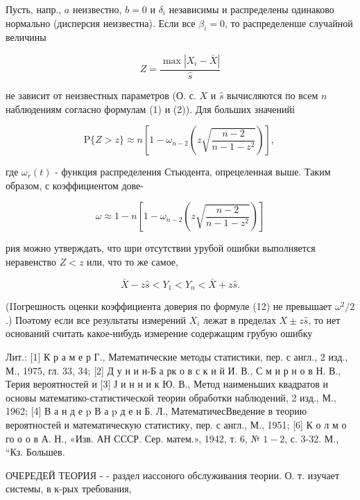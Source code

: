\documentclass[10pt]{article}
\begin{document}
Пусть, напр., $a$ неизвестно, $b=0$ и $\delta_{i}$ независимы и распределены одинаково нормально (дисперсия неизвестна). Если все $\beta_{i}=0$, то распределенше случайной величины



\[

Z=\frac{\max \left|X_{i}-\bar{X}\right|}{\hat{s}}

\]



не зависит от неизвестных параметров (О. с. $X$ и $\hat{s}$ вычисляются по всем $n$ наблюдениям согласно формулам (1) и (2)). Для больших значенийі



\[

\mathrm{P}\{Z>z\} \approx n\left[1-\omega_{n-2}\left(z \sqrt{\frac{n-2}{n-1-z^{2}}}\right)\right] \text {, }

\]



где $\omega_{r}(t)$ - функция распределения Стьюдента, опрецеленная выше. Таким образом, с коэффициентом дове-



\[

\omega \approx 1-n\left[1-\omega_{n-2}\left(z \sqrt{\frac{n-2}{n-1-z^{2}}}\right)\right]

\]



рия можно утверждать, что шри отсутствии урубой ошибки выполняется неравенство $Z<z$ или, что то же самое,



\[

\bar{X}-z \hat{s}<Y_{1}<Y_{n}<\bar{X}+z \hat{s} .

\]



(IIогрешность оценки коэффициента доверия по формуле (12) не превышает $\omega^{2} / 2$.) Поәтому если все результаты измерений $X_{i}$ лежат в пределах $X \pm z \hat{s}$, то нет оснований считать какое-нибудь измерение содержащим грубую ошибку



Лит.: [1] К р а м е р Г., Математические методы статистики, пер. с англ., 2 изд., М., 1975, гл. 33, 34; [2] Д у н и н-Б а рк о в с к и й И. В., С м и р н о в Н. В., Терия вероятностей и [3] Ј и н н и к Ю. В., Метод наименьших квадратов и основы математико-статистической теории обработки наблюдений, 2 изд., М., 1962; [4] В а н д е $\mathrm{p}$ В а p д е н Б. Л., МатематичесВведение в теорию вероятностей и математическую статистику, пер. с англ., М., 1951; [6] К о л м о го о о в А. Н., «Изв. АН СССР. Сер. матем.», 1942, т. 6, № $1-2$, с. 3-32. М., “Кз. Большев.



ОЧЕРЕДЕЙ ТЕОРИЯ - - раздел иассоного обслуживания теории. О. т. изучает системы, в к-рых требования,
\end{document}
